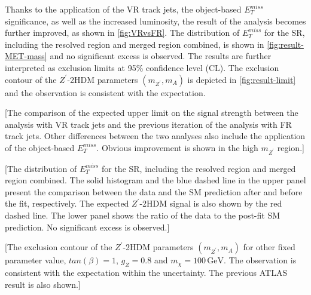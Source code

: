 \documentclass[class=NTHU_thesis, crop=false]{standalone}
\begin{document}
Thanks to the application of the VR track jets, the object-based $E^{miss}_T$ significance, as well as the increased luminosity, the result of the analysis becomes further improved, as shown in \cref{fig:VRvsFR}. The distribution of $E^{miss}_T$ for the SR, including the resolved region and merged region combined, is shown in \cref{fig:result-MET-mass} and no significant excess is observed. The results are further interpreted as exclusion limits at 95\% confidence level (CL). The exclusion contour of the $Z^\prime$-2HDM parameters $(m_{Z^\prime}, m_A)$ is depicted in \cref{fig:result-limit} and the observation is consistent with the expectation.

[The comparison of the expected upper limit on the signal strength between the analysis with VR track jets and the previous iteration of the analysis with FR track jets. Other differences between the two analyses also include the application of the object-based $E^{miss}_T$. Obvious improvement is shown in the high $m_{Z^\prime}$ region.]

[The distribution of $E^{miss}_T$ for the SR, including the resolved region and merged region combined. The solid histogram and the blue dashed line in the upper panel present the comparison between the data and the SM prediction after and before the fit, respectively. The expected $Z^\prime$-2HDM signal is also shown by the red dashed line. The lower panel shows the ratio of the data to the post-fit SM prediction. No significant excess is observed.]

[The exclusion contour of the $Z^\prime$-2HDM parameters $(m_{Z^\prime}, m_A)$ for other fixed parameter value, $tan(\beta) = 1$, $g_Z = 0.8$ and $m_\chi = 100\, \mathrm{GeV}$. The observation is consistent with the expectation within the uncertainty. The previous ATLAS result is also shown.]
\end{document}
